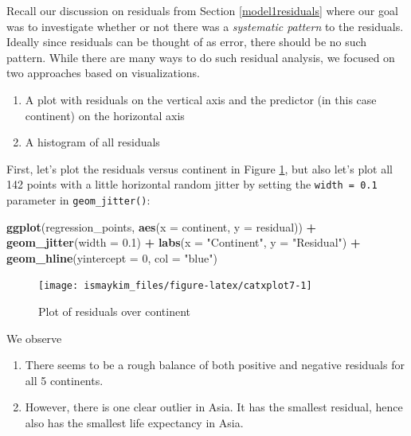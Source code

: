 \documentclass[12pt,]{krantz}
\makeatletter
\newenvironment{Shaded}{\begin{snugshade}}{\end{snugshade}}
\newcommand{\KeywordTok}[1]{\textcolor[rgb]{0.27,0.27,0.27}{\textbf{#1}}}
\newcommand{\DataTypeTok}[1]{\textcolor[rgb]{0.27,0.27,0.27}{#1}}
\newcommand{\DecValTok}[1]{\textcolor[rgb]{0.06,0.06,0.06}{#1}}
\newcommand{\FloatTok}[1]{\textcolor[rgb]{0.06,0.06,0.06}{#1}}
\newcommand{\StringTok}[1]{\textcolor[rgb]{0.5,0.5,0.5}{#1}}
\newcommand{\OperatorTok}[1]{\textcolor[rgb]{0.43,0.43,0.43}{\textbf{#1}}}
\newcommand{\NormalTok}[1]{#1}
\providecommand{\tightlist}{%
  \setlength{\itemsep}{0pt}\setlength{\parskip}{0pt}}
\newenvironment{kframe}{%
\medskip{}
\setlength{\fboxsep}{.8em}
 \def\at@end@of@kframe{}%
 \ifinner\ifhmode%
  \def\at@end@of@kframe{\end{minipage}}%
  \begin{minipage}{\columnwidth}%
 \fi\fi%
 \def\FrameCommand##1{\hskip\@totalleftmargin \hskip-\fboxsep
 \colorbox{shadecolor}{##1}\hskip-\fboxsep
     \hskip-\linewidth \hskip-\@totalleftmargin \hskip\columnwidth}%
 \MakeFramed {\advance\hsize-\width
   \@totalleftmargin\z@ \linewidth\hsize
   \@setminipage}}%
 {\par\unskip\endMakeFramed%
 \at@end@of@kframe}
\renewenvironment{Shaded}{\begin{kframe}}{\end{kframe}}
\theoremstyle{definition}
\theoremstyle{definition}
\theoremstyle{definition}
\theoremstyle{remark}
\makeatother
\begin{document}
Recall our discussion on residuals from Section \ref{model1residuals}
where our goal was to investigate whether or not there was a
\emph{systematic pattern} to the residuals. Ideally since residuals can
be thought of as error, there should be no such pattern. While there are
many ways to do such residual analysis, we focused on two approaches
based on visualizations.

\begin{enumerate}
\def\labelenumi{\arabic{enumi}.}
\tightlist
\item
  A plot with residuals on the vertical axis and the predictor (in this
  case continent) on the horizontal axis
\item
  A histogram of all residuals
\end{enumerate}

First, let's plot the residuals versus continent in Figure
\ref{fig:catxplot7}, but also let's plot all 142 points with a little
horizontal random jitter by setting the \texttt{width\ =\ 0.1} parameter
in \texttt{geom\_jitter()}:

\begin{Shaded}
\begin{Highlighting}[]
\KeywordTok{ggplot}\NormalTok{(regression_points, }\KeywordTok{aes}\NormalTok{(}\DataTypeTok{x =}\NormalTok{ continent, }\DataTypeTok{y =}\NormalTok{ residual)) }\OperatorTok{+}
\StringTok{  }\KeywordTok{geom_jitter}\NormalTok{(}\DataTypeTok{width =} \FloatTok{0.1}\NormalTok{) }\OperatorTok{+}\StringTok{ }
\StringTok{  }\KeywordTok{labs}\NormalTok{(}\DataTypeTok{x =} \StringTok{"Continent"}\NormalTok{, }\DataTypeTok{y =} \StringTok{"Residual"}\NormalTok{) }\OperatorTok{+}
\StringTok{  }\KeywordTok{geom_hline}\NormalTok{(}\DataTypeTok{yintercept =} \DecValTok{0}\NormalTok{, }\DataTypeTok{col =} \StringTok{"blue"}\NormalTok{)}
\end{Highlighting}
\end{Shaded}

\begin{figure}

{\centering \texttt{[image: ismaykim\_files/figure-latex/catxplot7-1]} 

}

\caption{Plot of residuals over continent}\label{fig:catxplot7}
\end{figure}

We observe

\begin{enumerate}
\def\labelenumi{\arabic{enumi}.}
\tightlist
\item
  There seems to be a rough balance of both positive and negative
  residuals for all 5 continents.
\item
  However, there is one clear outlier in Asia. It has the smallest
  residual, hence also has the smallest life expectancy in Asia.
\end{enumerate}
\end{document}

